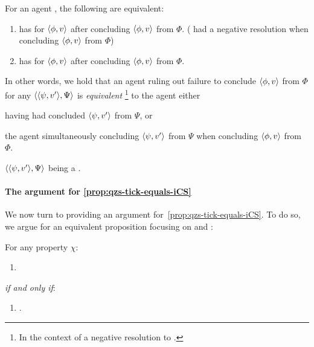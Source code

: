\begin{note}
  \begin{proposition}
    \label{prop:qzs-tick-equals-iCS}
    For an agent \vAgent{}, the following are equivalent:
    \begin{enumerate}[label=\arabic*., ref=(\arabic*)]
    \item
      \label{prop:qzs-tick-equals-iCS:qzS}
      \vAgent{} has \zS{} for \(\langle \phi, v \rangle\) after concluding \(\langle \phi, v \rangle\) from \(\Phi\).
      (\qzS{} had a negative resolution when concluding \(\langle \phi, v \rangle\) from \(\Phi\))
    \item
      \label{prop:qzs-tick-equals-iCS:ZS}
      \vAgent{} has \zetaS{} for \(\langle \phi, v \rangle\) after concluding \(\langle \phi, v \rangle\) from \(\Phi\).
    \end{enumerate}
    \vspace{-\baselineskip}
  \end{proposition}
  In other words, we hold that an agent ruling out failure to conclude \(\langle \phi, v \rangle\) from \(\Phi\) for any \requ{} \(\langle \langle \psi, v' \rangle, \Psi \rangle\) is \emph{equivalent}%
  \footnote{
    In the context of a negative resolution to \qzS{}.
  }
  to the agent either
  \begin{enumerate*}[label=(\alph*)]
  \item
    having had concluded \(\langle \psi, v' \rangle\) from \(\Psi\), or
  \item
    the agent simultaneously concluding \(\langle \psi, v' \rangle\) from \(\Psi\) when concluding \(\langle \phi, v \rangle\) from \(\Phi\).
  \item
    \(\langle \langle \psi, v' \rangle, \Psi \rangle\) being a .
  \end{enumerate*}
\end{note}

\paragraph*{The argument for \autoref{prop:qzs-tick-equals-iCS}}

\begin{note}
  We now turn to providing an argument for~\autoref{prop:qzs-tick-equals-iCS}.
  To do so, we argue for an equivalent proposition focusing on \qzS{} and \zetaS{}:

  \begin{proposition}
    \label{prop:qzs-tick-equals-iCS:var}
    For any property \(\chi\):
    \begin{enumerate}[label=\Alph*.]
    \item
      \label{squish:A}
    \end{enumerate}
    \emph{if and only if}:
    \begin{enumerate}[label=\Alph*.,resume]
    \item
      \label{squish:B}
      .
    \end{enumerate}
    \vspace{-\baselineskip}
  \end{proposition}
\end{note}

